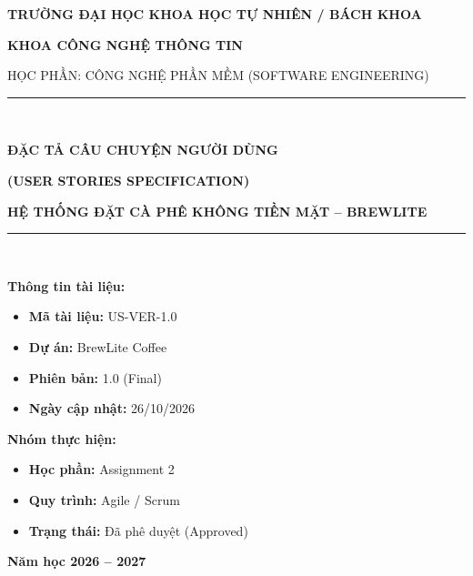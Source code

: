 \documentclass[12pt,a4paper]{article}
\begin{document}
\begin{titlepage}
    \centering
    \vspace*{1.5cm}
    
    {\Large \textbf{TRƯỜNG ĐẠI HỌC KHOA HỌC TỰ NHIÊN / BÁCH KHOA}\par}
    {\large \textbf{KHOA CÔNG NGHỆ THÔNG TIN}\par}
    \vspace{0.3cm}
    {\large HỌC PHẦN: CÔNG NGHỆ PHẦN MỀM (SOFTWARE ENGINEERING)\par}
    
    \vspace{2cm}
    \rule{\linewidth}{1.5pt}\\[0.4cm]
    {\huge \bfseries \textcolor{brewPrimary}{ĐẶC TẢ CÂU CHUYỆN NGƯỜI DÙNG}\par}
    {\Large \bfseries \textcolor{brewSecondary}{(USER STORIES SPECIFICATION)}\par}
    \vspace{0.2cm}
    {\large \textbf{HỆ THỐNG ĐẶT CÀ PHÊ KHÔNG TIỀN MẶT -- BREWLITE}\par}
    \rule{\linewidth}{1.5pt}\\[2cm]
    
    \begin{minipage}{0.48\textwidth}
        \textbf{Thông tin tài liệu:}
        \begin{itemize}[leftmargin=*,noitemsep]
            \item \textbf{Mã tài liệu:} US-VER-1.0
            \item \textbf{Dự án:} BrewLite Coffee
            \item \textbf{Phiên bản:} 1.0 (Final)
            \item \textbf{Ngày cập nhật:} 26/10/2026
        \end{itemize}
    \end{minipage}
    \hfill
    \begin{minipage}{0.48\textwidth}
        \textbf{Nhóm thực hiện:}
        \begin{itemize}[leftmargin=*,noitemsep]
            \item \textbf{Học phần:} Assignment 2
            \item \textbf{Quy trình:} Agile / Scrum
            \item \textbf{Trạng thái:} Đã phê duyệt (Approved)
        \end{itemize}
    \end{minipage}
    
    \vfill
    {\large \textbf{Năm học 2026 -- 2027}\par}
\end{titlepage}
\end{document}
